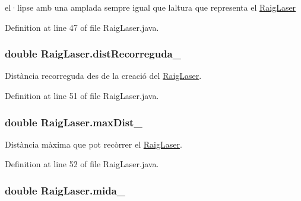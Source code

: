 el·lipse amb una amplada sempre igual que l\textquotesingle{}altura que representa el \hyperlink{class_raig_laser}{Raig\+Laser} 



Definition at line 47 of file Raig\+Laser.\+java.

\hypertarget{class_raig_laser_aecdc87070f24e6116db8f89d61d75b3a}{}
\subsubsection[{dist\+Recorreguda\+\_\+}]{\setlength{\rightskip}{0pt plus 5cm}double Raig\+Laser.\+dist\+Recorreguda\+\_\+\hspace{0.3cm}{\ttfamily [private]}}\label{class_raig_laser_aecdc87070f24e6116db8f89d61d75b3a}


Distància recorreguda des de la creació del \hyperlink{class_raig_laser}{Raig\+Laser}. 



Definition at line 51 of file Raig\+Laser.\+java.

\hypertarget{class_raig_laser_a950579f9b8aec21d629287044a7a65e7}{}
\subsubsection[{max\+Dist\+\_\+}]{\setlength{\rightskip}{0pt plus 5cm}double Raig\+Laser.\+max\+Dist\+\_\+\hspace{0.3cm}{\ttfamily [private]}}\label{class_raig_laser_a950579f9b8aec21d629287044a7a65e7}


Distància màxima que pot recòrrer el \hyperlink{class_raig_laser}{Raig\+Laser}. 



Definition at line 52 of file Raig\+Laser.\+java.

\hypertarget{class_raig_laser_ac18a272d02d6d090eebee561f05c1a0a}{}
\subsubsection[{mida\+\_\+}]{\setlength{\rightskip}{0pt plus 5cm}double Raig\+Laser.\+mida\+\_\+\hspace{0.3cm}{\ttfamily [private]}}\label{class_raig_laser_ac18a272d02d6d090eebee561f05c1a0a}


